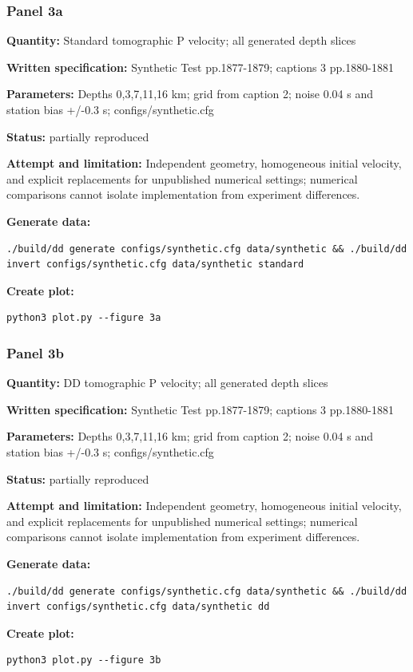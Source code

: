 \subsubsection*{Panel 3a}
\noindent\textbf{Quantity:} Standard tomographic P velocity; all generated depth slices\par
\noindent\textbf{Written specification:} Synthetic Test pp.1877-1879; captions 3 pp.1880-1881\par
\noindent\textbf{Parameters:} Depths 0,3,7,11,16 km; grid from caption 2; noise 0.04 s and station bias +/-0.3 s; configs/synthetic.cfg\par
\noindent\textbf{Status:} partially reproduced\par
\noindent\textbf{Attempt and limitation:} Independent geometry, homogeneous initial velocity, and explicit replacements for unpublished numerical settings; numerical comparisons cannot isolate implementation from experiment differences.\par
\noindent\textbf{Generate data:}
\begin{lstlisting}
./build/dd generate configs/synthetic.cfg data/synthetic && ./build/dd invert configs/synthetic.cfg data/synthetic standard
\end{lstlisting}
\noindent\textbf{Create plot:}
\begin{lstlisting}
python3 plot.py --figure 3a
\end{lstlisting}
\subsubsection*{Panel 3b}
\noindent\textbf{Quantity:} DD tomographic P velocity; all generated depth slices\par
\noindent\textbf{Written specification:} Synthetic Test pp.1877-1879; captions 3 pp.1880-1881\par
\noindent\textbf{Parameters:} Depths 0,3,7,11,16 km; grid from caption 2; noise 0.04 s and station bias +/-0.3 s; configs/synthetic.cfg\par
\noindent\textbf{Status:} partially reproduced\par
\noindent\textbf{Attempt and limitation:} Independent geometry, homogeneous initial velocity, and explicit replacements for unpublished numerical settings; numerical comparisons cannot isolate implementation from experiment differences.\par
\noindent\textbf{Generate data:}
\begin{lstlisting}
./build/dd generate configs/synthetic.cfg data/synthetic && ./build/dd invert configs/synthetic.cfg data/synthetic dd
\end{lstlisting}
\noindent\textbf{Create plot:}
\begin{lstlisting}
python3 plot.py --figure 3b
\end{lstlisting}
